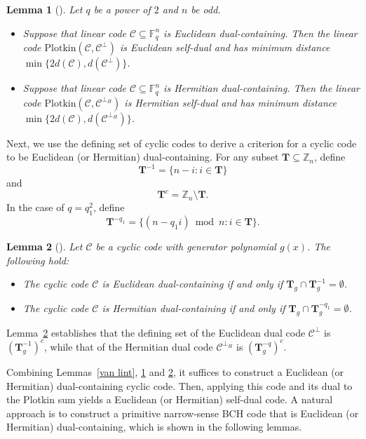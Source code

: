 \documentclass[10pt,a4paper]{amsart}
\newtheorem{lemma}{Lemma}
\begin{document}
\begin{lemma}[\cite{10856234}]
\label{self-dual}
    Let $q$ be a power of $2$ and $n$ be odd.
    \begin{itemize}
        \item Suppose that linear code $\mathcal{C}\subseteq \mathbb{F}_q^n$ is Euclidean dual-containing. Then the linear code $\text{Plotkin}(\mathcal{C},\mathcal{C}^\perp)$ is Euclidean self-dual and has minimum distance $\min\{2d(\mathcal{C}),d(\mathcal{C}^\perp)\}$.
        \item Suppose that linear code $\mathcal{C}\subseteq\mathbb{F}_q^n$ is Hermitian dual-containing. Then the linear code $\text{Plotkin}(\mathcal{C},\mathcal{C}^{\perp_H})$ is Hermitian self-dual and has minimum distance $\min\{2d(\mathcal{C}),d(\mathcal{C}^{\perp_H})\}$.
    \end{itemize}
\end{lemma}

Next, we use the defining set of cyclic codes to derive a criterion for a cyclic code to be Euclidean (or Hermitian) dual-containing. For any subset $\textbf{T}\subseteq \mathbb{Z}_n$, define 
\[\textbf{T}^{-1}=\{n-i:i\in \textbf{T}\}\]
and 
\[\textbf{T}^c=\mathbb{Z}_n\setminus \textbf{T}.\]
In the case of $q=q_1^2$, define 
\[\textbf{T}^{-q_1}=\{(n-q_1i)\bmod n:i\in\textbf{T}\}.\]

\begin{lemma}[\cite{4106108}]
\label{defining set}
    Let $\mathcal{C}$ be a cyclic code with generator polynomial $g(x)$. The following hold:
    \begin{itemize}
        \item The cyclic code $\mathcal{C}$ is Euclidean dual-containing if and only if $\textbf{T}_g\cap \textbf{T}_g^{-1}=\emptyset$.
        \item The cyclic code $\mathcal{C}$ is Hermitian dual-containing if and only if $\textbf{T}_g\cap\textbf{T}_g^{-q_1}=\emptyset$.
    \end{itemize}
\end{lemma}

Lemma~\ref{defining set} establishes that the defining set of the Euclidean dual code $\mathcal{C}^{\perp}$ is $(\mathbf{T}_g^{-1})^c$, while that of the Hermitian dual code $\mathcal{C}^{\perp_H}$ is $(\mathbf{T}_g^{-q})^c$.

Combining Lemmas~\ref{van lint}, \ref{self-dual} and \ref{defining set}, it suffices to construct a Euclidean (or Hermitian) dual-containing cyclic code. Then, applying this code and its dual to the Plotkin sum yields a Euclidean (or Hermitian) self-dual code. A natural approach is to construct a primitive narrow-sense BCH code that is Euclidean (or Hermitian) dual-containing, which is shown in the following lemmas.
\end{document}
